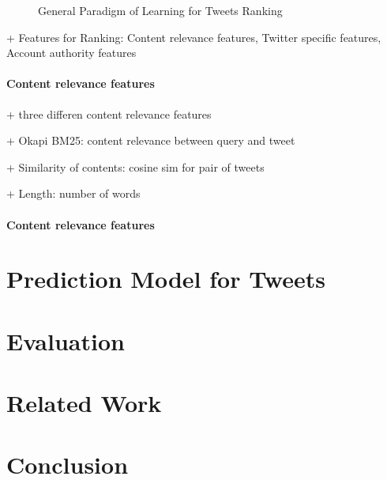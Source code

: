 \documentclass{proseminar}
\begin{document}
\begin{figure}[h]
\centering
{}
\caption{General Paradigm of Learning for Tweets Ranking}
\end{figure}

+ Features for Ranking: Content relevance features, Twitter specific features, Account authority features

\paragraph{Content relevance features}

+ three differen content relevance features

+ Okapi BM25: content relevance between query and tweet

+ Similarity  of  contents: cosine sim for pair of tweets

+ Length: number of words

\paragraph{Content relevance features}


\section{Prediction Model for Tweets}



\section{Evaluation}



\section{Related Work}



\section{Conclusion}




  

\balancecolumns
\end{document}
